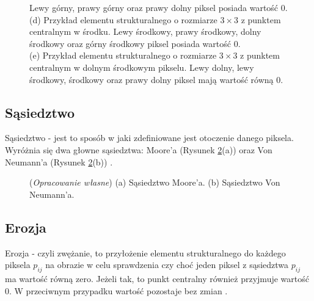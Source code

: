 \documentclass{article}
\begin{document}
\begin{figure}[H]
{            Lewy górny, prawy górny oraz prawy dolny piksel posiada wartość 0.\\
            (d) Przykład elementu strukturalnego o rozmiarze \(3 \times 3\) z punktem centralnym w środku.
            Lewy środkowy, prawy środkowy, dolny środkowy oraz górny środkowy piksel posiada wartość 0.\\
            (e) Przykład elementu strukturalnego o rozmiarze \(3 \times 3\) z punktem centralnym w dolnym środkowym pikselu.
            Lewy dolny, lewy środkowy, środkowy oraz prawy dolny piksel mają wartość równą 0.}
            \label{elementy_strukturalne}
        \end{figure}

        \subsection{Sąsiedztwo}
        {
            \label{sec:sasiedztwo}
            \Large
            \justifying
            \quad
            Sąsiedztwo - jest to sposób w jaki zdefiniowane jest otoczenie danego piksela.
            Wyróżnia się dwa głowne sąsiedztwa: Moore'a (Rysunek \ref{neighbourhood}(a)) oraz Von Neumann'a (Rysunek \ref{neighbourhood}(b)) \cite{Digital Image Processing Second Edition}.
        }
        \begin{figure}[H]
            \centering
            \qquad
            \caption{(\textit{Opracowanie własne}) (a) Sąsiedztwo Moore'a. (b) Sąsiedztwo Von Neumann'a.}
            \label{neighbourhood}
        \end{figure}

        \subsection{Erozja}
        {
            \label{sec:erozja}
            \Large
            \justifying
            \quad
            Erozja - czyli zwężanie, to przyłożenie elementu strukturalnego do każdego piksela \(p_{ij}\) na obrazie w celu sprawdzenia czy choć jeden piksel z sąsiedztwa \(p_{ij}\) ma wartość równą zero.
            Jeżeli tak, to punkt centralny również przyjmuje wartość 0. W przeciwnym przypadku wartość pozostaje bez zmian \cite{Digital Image Processing Second Edition}.
        }
\end{document}
